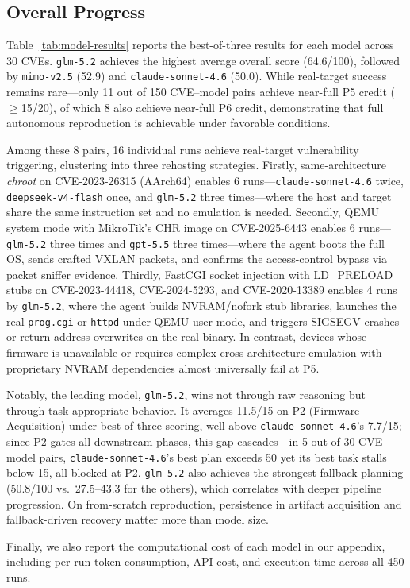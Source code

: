 \subsection{Overall Progress}
Table~\ref{tab:model-results} reports the best-of-three results for each model across 30 CVEs. \texttt{glm-5.2} achieves the highest average overall score (64.6/100), followed by \texttt{mimo-v2.5} (52.9) and \texttt{claude-sonnet-4.6} (50.0). While real-target success remains rare---only 11 out of 150 CVE--model pairs achieve near-full P5 credit ($\geq$15/20), of which 8 also achieve near-full P6 credit, demonstrating that full autonomous reproduction is achievable under favorable conditions.


Among these 8 pairs, 16 individual runs achieve real-target vulnerability triggering, clustering into three rehosting strategies. Firstly, same-architecture \textit{chroot} on CVE-2023-26315 (AArch64) enables 6 runs---\texttt{claude-sonnet-4.6} twice, \texttt{deepseek-v4-flash} once, and \texttt{glm-5.2} three times---where the host and target share the same instruction set and no emulation is needed. Secondly, QEMU system mode with MikroTik's CHR image on CVE-2025-6443 enables 6 runs---\texttt{glm-5.2} three times and \texttt{gpt-5.5} three times---where the agent boots the full OS, sends crafted VXLAN packets, and confirms the access-control bypass via packet sniffer evidence. Thirdly, FastCGI socket injection with LD\_PRELOAD stubs on CVE-2023-44418, CVE-2024-5293, and CVE-2020-13389 enables 4 runs by \texttt{glm-5.2}, where the agent builds NVRAM/nofork stub libraries, launches the real \texttt{prog.cgi} or \texttt{httpd} under QEMU user-mode, and triggers SIGSEGV crashes or return-address overwrites on the real binary. In contrast, devices whose firmware is unavailable or requires complex cross-architecture emulation with proprietary NVRAM dependencies almost universally fail at P5.


Notably, the leading model, \texttt{glm-5.2}, wins not through raw reasoning but through task-appropriate behavior. It averages 11.5/15 on P2 (Firmware Acquisition) under best-of-three scoring, well above \texttt{claude-sonnet-4.6}'s 7.7/15; since P2 gates all downstream phases, this gap cascades---in 5 out of 30 CVE--model pairs, \texttt{claude-sonnet-4.6}'s best plan exceeds 50 yet its best task stalls below 15, all blocked at P2. \texttt{glm-5.2} also achieves the strongest fallback planning (50.8/100 vs.\ 27.5--43.3 for the others), which correlates with deeper pipeline progression. On from-scratch reproduction, persistence in artifact acquisition and fallback-driven recovery matter more than model size.

Finally, we also report the computational cost of each model in our appendix, including per-run token consumption, API cost, and execution time across all 450 runs.
